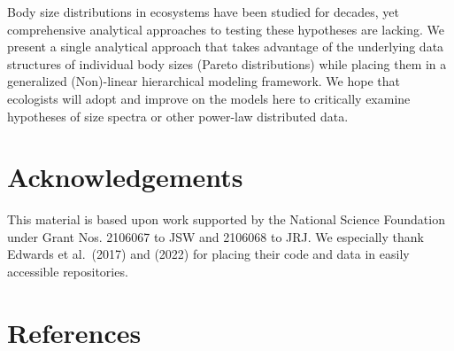 \documentclass[
  12pt,
]{article}
\numberwithin{equation}
\begin{document}
Body size distributions in ecosystems have been studied for decades, yet
comprehensive analytical approaches to testing these hypotheses are
lacking. We present a single analytical approach that takes advantage of
the underlying data structures of individual body sizes (Pareto
distributions) while placing them in a generalized (Non)-linear
hierarchical modeling framework. We hope that ecologists will adopt and
improve on the models here to critically examine hypotheses of size
spectra or other power-law distributed data.

\hypertarget{acknowledgements}{%
\section{Acknowledgements}\label{acknowledgements}}

This material is based upon work supported by the National Science
Foundation under Grant Nos. 2106067 to JSW and 2106068 to JRJ. We
especially thank Edwards et al.~(2017) and (2022) for placing their code
and data in easily accessible repositories.

\hypertarget{references}{%
\section{References}\label{references}}
\end{document}
